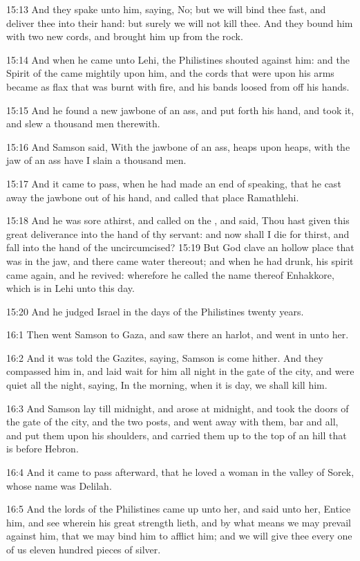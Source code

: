 15:13 And they spake unto him, saying, No; but we will bind thee fast, and deliver thee into their hand: but surely we will not kill thee.  And they bound him with two new cords, and brought him up from the rock.

15:14 And when he came unto Lehi, the Philistines shouted against him: and the Spirit of the \LORD came mightily upon him, and the cords that were upon his arms became as flax that was burnt with fire, and his bands loosed from off his hands.

15:15 And he found a new jawbone of an ass, and put forth his hand, and took it, and slew a thousand men therewith.

15:16 And Samson said, With the jawbone of an ass, heaps upon heaps, with the jaw of an ass have I slain a thousand men.

15:17 And it came to pass, when he had made an end of speaking, that he cast away the jawbone out of his hand, and called that place Ramathlehi.

15:18 And he was sore athirst, and called on the \LORD, and said, Thou hast given this great deliverance into the hand of thy servant: and now shall I die for thirst, and fall into the hand of the uncircumcised?  15:19 But God clave an hollow place that was in the jaw, and there came water thereout; and when he had drunk, his spirit came again, and he revived: wherefore he called the name thereof Enhakkore, which is in Lehi unto this day.

15:20 And he judged Israel in the days of the Philistines twenty years.

16:1 Then went Samson to Gaza, and saw there an harlot, and went in unto her.

16:2 And it was told the Gazites, saying, Samson is come hither. And they compassed him in, and laid wait for him all night in the gate of the city, and were quiet all the night, saying, In the morning, when it is day, we shall kill him.

16:3 And Samson lay till midnight, and arose at midnight, and took the doors of the gate of the city, and the two posts, and went away with them, bar and all, and put them upon his shoulders, and carried them up to the top of an hill that is before Hebron.

16:4 And it came to pass afterward, that he loved a woman in the valley of Sorek, whose name was Delilah.

16:5 And the lords of the Philistines came up unto her, and said unto her, Entice him, and see wherein his great strength lieth, and by what means we may prevail against him, that we may bind him to afflict him; and we will give thee every one of us eleven hundred pieces of silver.

